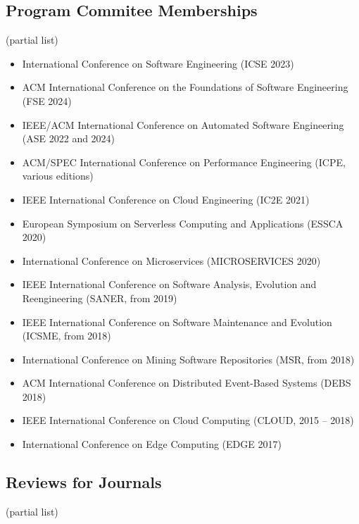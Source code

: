 \documentclass[paper=letter,fontsize=11pt]{scrartcl} %
\begin{document}
\subsection*{Program Commitee Memberships}

(partial list)

\begin{itemize}
  \item International Conference on Software Engineering (ICSE 2023)
  \item ACM International Conference on the Foundations of Software Engineering (FSE 2024)
  \item IEEE/ACM International Conference on Automated Software Engineering (ASE 2022 and 2024)
	\item ACM/SPEC International Conference on Performance Engineering (ICPE, various editions)
  \item IEEE International Conference on Cloud Engineering (IC2E 2021)
	\item European Symposium on Serverless Computing and Applications (ESSCA 2020)
	\item International Conference on Microservices (MICROSERVICES 2020)
	\item IEEE International Conference on Software Analysis, Evolution and Reengineering (SANER, from 2019)
	\item IEEE International Conference on Software Maintenance and Evolution (ICSME, from 2018)
	\item International Conference on Mining Software Repositories (MSR, from 2018)
  \item ACM International Conference on Distributed Event-Based Systems (DEBS 2018)
	\item IEEE International Conference on Cloud Computing (CLOUD, 2015 -- 2018)
	\item International Conference on Edge Computing (EDGE 2017)
\end{itemize}

\subsection*{Reviews for Journals}

(partial list)
\end{document}
